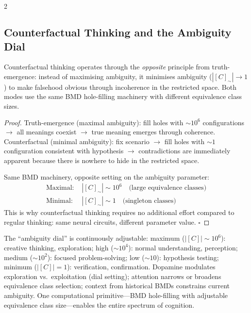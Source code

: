 \begin{multicols}{2}
\subsection{Counterfactual Thinking and the Ambiguity Dial}
\label{ssec:counterfactual}

\begin{theorem}
\label{thm:counterfactual}
Counterfactual thinking operates through the \emph{opposite} principle from
truth-emergence: instead of maximising ambiguity, it minimises ambiguity
($|[C]_\sim| \to 1$) to make falsehood obvious through incoherence in the
restricted space.  Both modes use the same BMD hole-filling machinery with
different equivalence class sizes.
\end{theorem}

\begin{proof}
Truth-emergence (maximal ambiguity): fill holes with $\sim10^6$
configurations $\to$ all meanings coexist $\to$ true meaning emerges through
coherence.
Counterfactual (minimal ambiguity): fix scenario $\to$ fill holes with
$\sim1$ configuration consistent with hypothesis $\to$ contradictions are
immediately apparent because there is nowhere to hide in the restricted space.

Same BMD machinery, opposite setting on the ambiguity parameter:
\begin{align}
\text{Maximal: } &|[C]_\sim| \sim 10^6 \quad\text{(large equivalence classes)} \\
\text{Minimal: } &|[C]_\sim| \sim 1 \quad\text{(singleton classes)}
\end{align}
This is why counterfactual thinking requires no additional effort compared
to regular thinking: same neural circuits, different parameter value. $\square$
\end{proof}

The ``ambiguity dial'' is continuously adjustable:
maximum ($|[C]|\sim10^6$): creative thinking, exploration;
high ($\sim10^4$): normal understanding, perception;
medium ($\sim10^2$): focused problem-solving;
low ($\sim10$): hypothesis testing;
minimum ($|[C]|=1$): verification, confirmation.
Dopamine modulates exploration vs.\ exploitation (dial setting);
attention narrows or broadens equivalence class selection;
context from historical BMDs constrains current ambiguity.
One computational primitive---BMD hole-filling with adjustable
equivalence class size---enables the entire spectrum of cognition.


\end{multicols}
